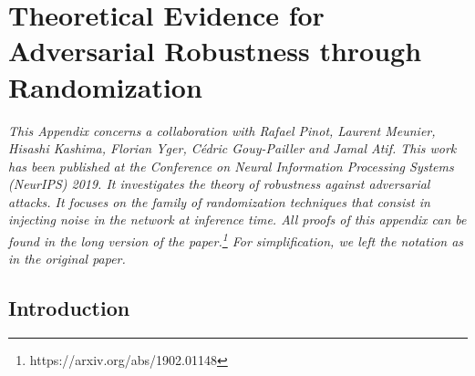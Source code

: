 \chapter{Theoretical Evidence for Adversarial Robustness through Randomization}
\label{appendix:ap3-theoretical_evidence_for_adversarial_robustness_through_randomization}
\localtoc

\vspace{\fill}

\noindent
\emph{
This Appendix concerns a collaboration with Rafael Pinot, Laurent Meunier, Hisashi Kashima, Florian Yger, Cédric Gouy-Pailler and Jamal Atif.
This work has been published at the Conference on Neural Information Processing Systems (NeurIPS) 2019.
It investigates the theory of robustness against adversarial attacks. It focuses on the family of randomization techniques that consist in injecting noise in the network at inference time.
All proofs of this appendix can be found in the long version of the paper.\footnote{https://arxiv.org/abs/1902.01148}
For simplification, we left the notation as in the original paper.
}

\vspace{\fill}



\section{Introduction}
\label{section:ap3-introduction}

